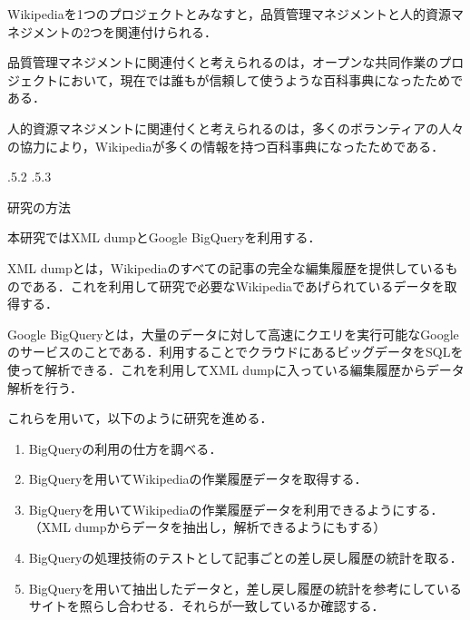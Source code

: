 \documentclass[uplatex]{jsarticle}
\makeatletter
\renewcommand{\section}{%
    \if@slide\clearpage\fi
    \@startsection{section}{1}{\z@}%
    {\Cvs \@plus.5\Cdp \@minus.2\Cdp}%
    {.5\Cvs \@plus.3\Cdp}%
    {\normalfont\raggedright}}
\makeatother
\begin{document}
Wikipediaを1つのプロジェクトとみなすと，品質管理マネジメントと人的資源マネジメントの2つを関連付けられる\cite{pmbok}．

品質管理マネジメントに関連付くと考えられるのは，オープンな共同作業のプロジェクトにおいて，現在では誰もが信頼して使うような百科事典になったためである．

人的資源マネジメントに関連付くと考えられるのは，多くのボランティアの人々の協力により，Wikipediaが多くの情報を持つ百科事典になったためである．






\section{研究の方法}

本研究ではXML dump\cite{DBdump}とGoogle BigQuery\cite{GBQ}を利用する．

XML dumpとは，Wikipediaのすべての記事の完全な編集履歴を提供しているものである．これを利用して研究で必要なWikipediaであげられているデータを取得する．

Google BigQueryとは，大量のデータに対して高速にクエリを実行可能なGoogleのサービスのことである．利用することでクラウドにあるビッグデータをSQLを使って解析できる．これを利用してXML dumpに入っている編集履歴からデータ解析を行う．

これらを用いて，以下のように研究を進める．

\begin{enumerate}
\item BigQueryの利用の仕方を調べる\cite{WhatGBQ}．

\item BigQueryを用いてWikipediaの作業履歴データを取得する．

\item BigQueryを用いてWikipediaの作業履歴データを利用できるようにする．（XML dumpからデータを抽出し，解析できるようにもする）

\item BigQueryの処理技術のテストとして記事ごとの差し戻し履歴の統計を取る．

\item BigQueryを用いて抽出したデータと，差し戻し履歴の統計を参考にしているサイト\cite{rv}を照らし合わせる．それらが一致しているか確認する．
\end{enumerate}
\end{document}
